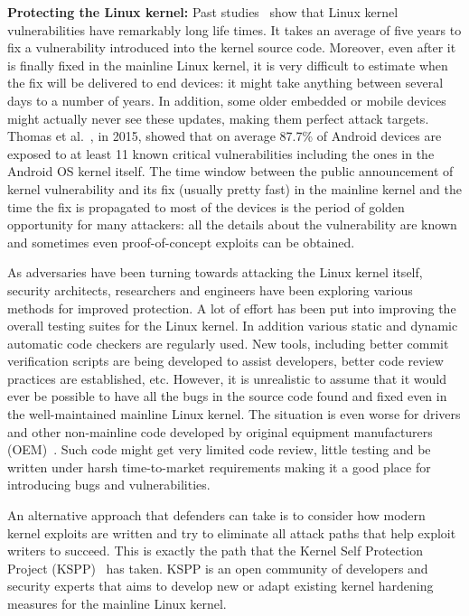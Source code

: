 \textbf{Protecting the Linux kernel:}   Past studies~\cite{stoep2016android, cooklss2016} show that Linux kernel vulnerabilities have remarkably long life times. It takes an average of five years to fix a vulnerability introduced into the kernel source code. Moreover, even after it is finally fixed in the mainline Linux kernel, it is very difficult to estimate when the fix will be delivered to end devices: it might take anything between several days to a number of years. In addition, some older embedded or mobile devices might actually never see these updates, making them perfect attack targets. Thomas et al.~\cite{Thomas2015}, in 2015, showed that on average 87.7\% of Android devices are exposed to at least 11 known critical vulnerabilities including the ones in the Android OS kernel itself. The time window between the public announcement of kernel vulnerability and its fix (usually pretty fast) in the mainline kernel and the time the fix is propagated to most of the devices is the period of golden opportunity for many attackers: all the details about the vulnerability are known and sometimes even proof-of-concept exploits can be obtained.

As adversaries have been turning towards attacking the Linux kernel itself, security architects, researchers and engineers have been exploring various methods for improved protection. A lot of effort has been put into improving the overall testing suites for the Linux kernel. In addition various static and dynamic automatic code checkers are regularly used. New tools, including better commit verification scripts are being developed to assist developers, better code review practices are established, etc. However, it is unrealistic to assume that it would ever be possible to have all the bugs in the source code found and fixed even in the well-maintained mainline Linux kernel. The situation is even worse for drivers and other non-mainline code developed by original equipment manufacturers (OEM)~\cite{stoep2016android}. Such code might get very limited code review, little testing and be written under harsh time-to-market requirements making it a good place for introducing bugs and vulnerabilities.

An alternative approach that defenders can take is to consider how modern kernel exploits are written and try to eliminate all attack paths that help exploit writers to succeed. This is exactly the path that the Kernel Self Protection Project (KSPP)~\cite{kspp} has taken. KSPP is an open community of developers and security experts that aims to develop new or adapt existing kernel hardening measures for the mainline Linux kernel. 

